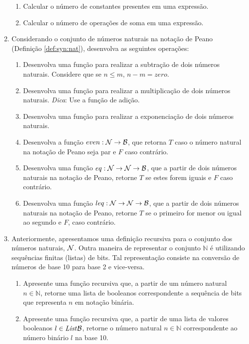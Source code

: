 \begin{enumerate}
\begin{enumerate}
       \item Calcular o número de constantes presentes em uma expressão.
       \item Calcular o número de operações de soma em uma expressão.
  \end{enumerate}
  \item Considerando o conjunto de números naturais na notação de Peano (Definição \ref{def:syn:nat}), desenvolva as seguintes operações:
  \begin{enumerate}
       \item Desenvolva uma função para realizar a subtração de dois números naturais. Considere que se $n \leq m$, $n - m = zero$.
       \item Desenvolva uma função para realizar a multiplicação de dois números naturais. \textit{Dica}: Use a função de adição.
       \item Desenvolva uma função para realizar a exponenciação de dois números naturais.
       \item Desenvolva a função $even : \mathcal{N}\to\mathcal{B}$, que retorna $T$ caso o número natural na notação de Peano seja par e $F$ caso contrário.
       \item Desenvolva uma função $eq : \mathcal{N} \to \mathcal{N} \to \mathcal{B}$, que a partir de dois números naturais na notação de Peano, retorne $T$ se estes forem iguais e $F$ caso contrário.
       \item Desenvolva uma função $leq : \mathcal{N} \to \mathcal{N} \to \mathcal{B}$, que a partir de dois números naturais na notação de Peano, retorne $T$ se o primeiro for menor ou igual ao segundo e $F$, caso contrário.
  \end{enumerate}
  \item Anteriormente, apresentamos uma definição recursiva para o conjunto dos números naturais, $\mathcal{N}$. Outra maneira de representar o conjunto $\mathbb{N}$
           é utilizando sequências finitas (listas) de bits. Tal representação consiste na conversão de números de base 10 para base 2 e vice-versa.
 \begin{enumerate}
      \item Apresente uma função recursiva que, a partir de um número natural $n \in \mathbb{N}$, retorne uma lista de booleanos correspondente a sequência de bits
               que representa $n$ em notação binária.
      \item Apresente uma função recursiva que, a partir de uma lista de valores booleanos $l \in \textit{List\/}\mathcal{B}$, retorne o número natural $n \in \mathbb{N}$
               correspondente ao número binário $l$ na base 10.
 \end{enumerate}
\end{enumerate}

